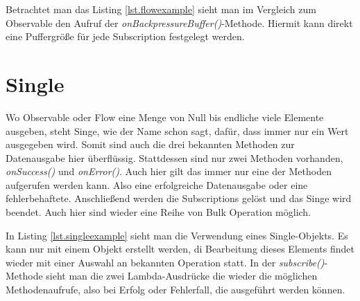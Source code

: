 Betrachtet man das Listing \ref{lst.flowexample} sieht man im Vergleich zum Observable den Aufruf der \textit{onBackpressureBuffer()}-Methode. Hiermit kann direkt eine Puffergröße für jede Subscription festgelegt werden. 

\section{Single}
Wo Observable oder Flow eine Menge von Null bis endliche viele Elemente ausgeben, steht Singe, wie der Name schon sagt, dafür, dass immer nur ein Wert ausgegeben wird. Somit sind auch die drei bekannten Methoden zur Datenausgabe hier überflüssig. Stattdessen sind nur zwei Methoden vorhanden, \textit{onSuccess()} und \textit{onError()}. Auch hier gilt das immer nur eine der Methoden aufgerufen werden kann. Also eine erfolgreiche Datenausgabe oder eine fehlerbehaftete. Anschließend werden die Subscriptions gelöst und das Singe wird beendet. Auch hier sind wieder eine Reihe von Bulk Operation möglich. 

In Listing \ref{lst.singleexample} sieht man die Verwendung eines Single-Objekts. Es kann nur mit einem Objekt erstellt werden, di Bearbeitung dieses Elements findet wieder mit einer Auswahl an bekannten Operation statt. In der \textit{subscribe()}-Methode sieht man die zwei Lambda-Ausdrücke die wieder die möglichen Methodenaufrufe, also bei Erfolg oder Fehlerfall, die ausgeführt werden können.
